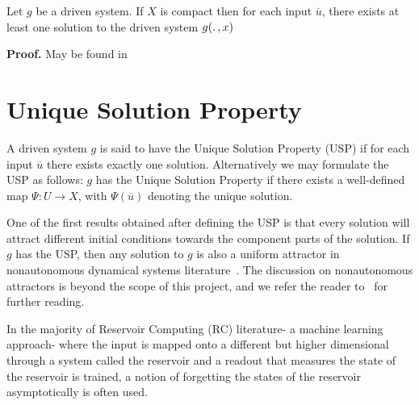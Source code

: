 \begin{Theorem}\label{Thm_CompactExistence}
 Let $g$ be a driven system.  If $X$ is compact then for each input $\overline{u}$, there exists at least one solution to the driven system $g(\ldotp, x)$
\end{Theorem}
\vspace{-6mm}
{\bf Proof.} May be found in~\cite{kloeden2011nonautonomous, manjunath2014dynamics, manjunath2013echo}
\section{Unique Solution Property}

\begin{Definition}
  \label{Dfn_usp}\rm
  A driven system $g$ is said to have the Unique Solution Property (USP) if for each input $\overline{u}$ there exists exactly one solution. 
  Alternatively we may formulate the USP as follows: $g$ has the Unique Solution Property if there exists a well-defined map $\Psi:{U}\to{X}$, with $\Psi({\overline{u}})$ denoting the unique solution.
\end{Definition}

One of the first results obtained after defining the USP is that every solution will attract different initial conditions towards the component parts of the solution.
If $g$ has the USP, then any solution to $g$ is also a uniform attractor in nonautonomous dynamical systems literature~\cite{Manju_Nonlinearity}. The discussion on nonautonomous attractors is beyond the scope of this project, and we refer the reader to~\cite{Manju_ESP, esann2012ids} for further reading. 


In the majority of Reservoir Computing (RC) literature- a machine learning approach- where the input is mapped onto a different but higher dimensional through a system called the reservoir and a readout that measures the state of the reservoir is trained, a notion of forgetting the states of the reservoir asymptotically is often used.  


